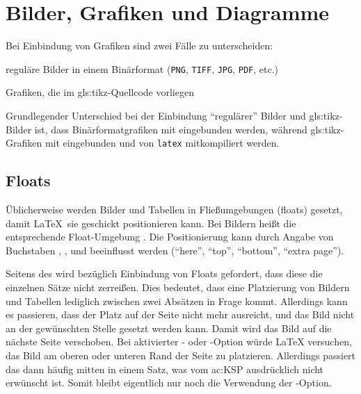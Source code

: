 \section[Bilder, Grafiken und Diagramme]{Bilder, Grafiken und Diagramme}
\label{sec:Bilder}
%
Bei Einbindung von Grafiken sind zwei Fälle zu unterscheiden:
\begin{itemize*}
  \item reguläre Bilder in einem Binärformat
	      (\texttt{PNG}, \texttt{TIFF}, \texttt{JPG}, \texttt{PDF}, etc.)
	\item {}Grafiken, die im \gls{gls:tikz}-Quellcode vorliegen 
\end{itemize*}

Grundlegender Unterschied bei der Einbindung \enquote{regulärer} Bilder
und \gls{gls:tikz}-Bilder ist, dass Binärformatgrafiken mit 
eingebunden werden, während \gls{gls:tikz}-Grafiken mit  eingebunden
und von \texttt{latex} mitkompiliert werden.


\subsection[Floats]{Floats}%
\label{sec:Floats}
%
Üblicherweise werden Bilder und Tabellen in Fließumgebungen (floats) gesetzt,
damit \LaTeX\ sie geschickt positionieren kann.
Bei Bildern heißt die entsprechende Float-Umgebung .
Die Positionierung kann durch Angabe von Buchstaben
, ,  und 
beeinflusst werden
(\enquote{here}, \enquote{top}, \enquote{bottom}, \enquote{extra page}).

Seitens des  wird bezüglich Einbindung von Floats gefordert,
dass diese die einzelnen Sätze nicht zerreißen.
Dies bedeutet, dass eine Platzierung von Bildern und Tabellen lediglich
zwischen zwei Absätzen in Frage kommt.
Allerdings kann es passieren, dass der Platz auf der Seite nicht mehr ausreicht,
und das Bild nicht an der gewünschten Stelle gesetzt werden kann.
Damit wird das Bild auf die nächste Seite verschoben.
Bei aktivierter - oder -Option würde \LaTeX{} versuchen,
das Bild am oberen oder unteren Rand der Seite zu platzieren.
Allerdings passiert das dann häufig mitten in einem Satz,
was vom \gls{ac:KSP} ausdrücklich nicht erwünscht ist.
Somit bleibt eigentlich nur noch die Verwendung der -Option.

